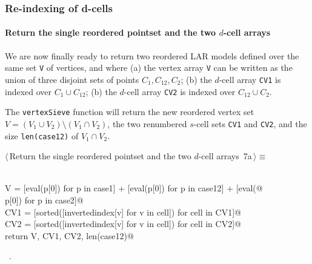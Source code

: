 \documentclass[11pt,oneside]{article}	%
\begin{document}
\subsubsection{Re-indexing of d-cells}

\paragraph{Return the single reordered pointset and the two $d$-cell arrays}
We are now finally ready to return two reordered LAR models defined over the same set \texttt{V} of vertices, and where (a) the vertex array \texttt{V} can be written as the union of three disjoint sets of points $C_1,C_{12},C_2$; (b) the $d$-cell array \texttt{CV1} is indexed over $C_1\cup C_{12}$; (b) the $d$-cell array \texttt{CV2} is indexed over $C_{12}\cup C_{2}$. 

The \texttt{vertexSieve} function will return the new reordered vertex set $V = (V_1 \cup V_2) \setminus (V_1 \cap V_2)$, the two renumbered $s$-cell sets \texttt{CV1} and \texttt{CV2}, and the size \texttt{len(case12)} of $V_1 \cap V_2$.
\begin{flushleft} \small \label{scrap8}
\protect{}$\langle\,$Return the single reordered pointset and the two $d$-cell arrays\nobreak\ {\footnotesize 7a}$\,\rangle\equiv$
\vspace{-1ex}
\begin{list}{}{} \item
\mbox{}\verb@@\\
\mbox{}\verb@   V = [eval(p[0]) for p in case1] + [eval(p[0]) for p in case12] + [eval(@\\
\mbox{}\verb@            p[0]) for p in case2]@\\
\mbox{}\verb@   CV1 = [sorted([invertedindex[v] for v in cell]) for cell in CV1]@\\
\mbox{}\verb@   CV2 = [sorted([invertedindex[v] for v in cell]) for cell in CV2]@\\
\mbox{}\verb@   return V, CV1, CV2, len(case12)@\\
\mbox{}\verb@@{\NWsep}
\end{list}
\vspace{-1ex}
\footnotesize\addtolength{\baselineskip}{-1ex}
\begin{list}{}{\setlength{\itemsep}{-\parsep}\setlength{\itemindent}{-\leftmargin}}
\item \NWtxtMacroRefIn\ .
\end{list}
\end{flushleft}
\end{document}
